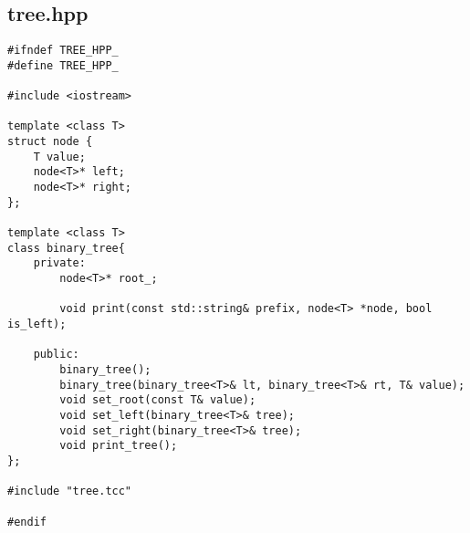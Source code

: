 \subsection{tree.hpp}
\begin{verbatim}
#ifndef TREE_HPP_
#define TREE_HPP_

#include <iostream>

template <class T>
struct node {
    T value;
    node<T>* left;
    node<T>* right;
};

template <class T>
class binary_tree{
    private:
        node<T>* root_;

        void print(const std::string& prefix, node<T> *node, bool is_left);

    public:
        binary_tree();
        binary_tree(binary_tree<T>& lt, binary_tree<T>& rt, T& value);
        void set_root(const T& value);
        void set_left(binary_tree<T>& tree);
        void set_right(binary_tree<T>& tree);
        void print_tree();
};

#include "tree.tcc"

#endif
\end{verbatim}


